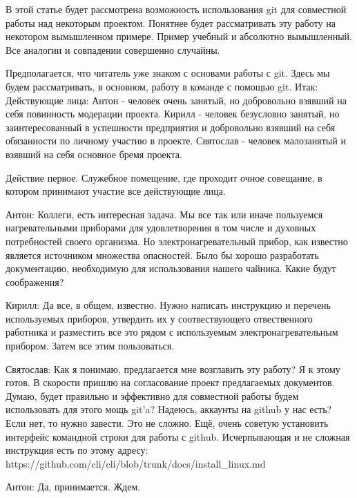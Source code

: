 В этой статье будет рассмотрена возможность использования git для совместной работы над 
некоторым проектом. Понятнее будет рассматривать эту работу на некотором вымышленном примере. 
Пример учебный и абсолютно вымышленный. Все аналогии и совпадении совершенно случайны.

Предполагается, что читатель уже знаком с основами работы с git. Здесь мы будем рассматривать,
в основном, работу в команде с помощью git.
Итак:
Действующие лица:
Антон - человек очень занятый, но добровольно взявший на себя повинность модерации проекта.
Кирилл - человек безусловно занятый, но заинтересованный в успешности предприятия и добровольно
взявший на себя обязанности по личному участию в проекте.
Святослав - человек малозанятый и взявший на себя основное бремя проекта.

Действие первое. 
Служебное помещение, где проходит очное совещание, в котором принимают участие все действующие лица.

Антон: Коллеги, есть интересная задача. Мы все так или иначе пользуемся нагревательными приборами
для удовлетворения в том числе и духовных потребностей своего организма. Но электронагревательный 
прибор, как известно является источником множества опасностей. Было бы хорошо разработать
документацию, необходимую для использования нашего чайника. Какие будут соображения?

Кирилл: Да все, в общем, известно. Нужно написать инструкцию и перечень используемых приборов, 
утвердить их у соотвествующего отвественного работника и разместить все это рядом с используемым
электронагревательным прибором. Затем все этим пользоваться. 

Святослав: Как я понимаю, предлагается мне возглавить эту работу? Я к этому готов. В скорости
пришлю на согласование проект предлагаемых документов. Думаю, будет правильно и эффективно
для совместной работы будем использовать для этого мощь git'a? Надеюсь, аккаунты на github у нас есть?
Если нет, то нужно завести. Это не сложно. Ещё, очень советую установить интерфейс командной
строки для работы с github. Исчерпывающая и не сложная инструкция есть по этому адресу:
https://github.com/cli/cli/blob/trunk/docs/install\_linux.md

Антон: Да, принимается. Ждем.

